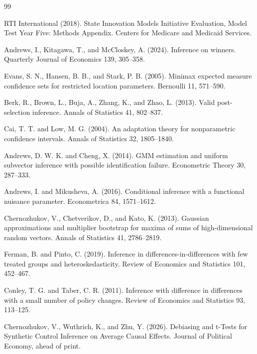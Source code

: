 \documentclass{article}
\begin{document}
\begin{thebibliography}{99}

   RTI International (2018). State Innovation Models Initiative Evaluation, Model Test Year Five: Methods Appendix. Centers for Medicare and Medicaid Services.

   Andrews, I., Kitagawa, T., and McCloskey, A. (2024). Inference on winners. Quarterly Journal of Economics 139, 305--358.

   Evans, S. N., Hansen, B. B., and Stark, P. B. (2005). Minimax expected measure confidence sets for restricted location parameters. Bernoulli 11, 571--590.

   Berk, R., Brown, L., Buja, A., Zhang, K., and Zhao, L. (2013). Valid post-selection inference. Annals of Statistics 41, 802--837.

   Cai, T. T. and Low, M. G. (2004). An adaptation theory for nonparametric confidence intervals. Annals of Statistics 32, 1805--1840.

   Andrews, D. W. K. and Cheng, X. (2014). GMM estimation and uniform subvector inference with possible identification failure. Econometric Theory 30, 287--333.

   Andrews, I. and Mikusheva, A. (2016). Conditional inference with a functional nuisance parameter. Econometrica 84, 1571--1612.

   Chernozhukov, V., Chetverikov, D., and Kato, K. (2013). Gaussian approximations and multiplier bootstrap for maxima of sums of high-dimensional random vectors. Annals of Statistics 41, 2786--2819.

   Ferman, B. and Pinto, C. (2019). Inference in differences-in-differences with few treated groups and heteroskedasticity. Review of Economics and Statistics 101, 452--467.

   Conley, T. G. and Taber, C. R. (2011). Inference with difference in differences with a small number of policy changes. Review of Economics and Statistics 93, 113--125.

   Chernozhukov, V., Wuthrich, K., and Zhu, Y. (2026). Debiasing and t-Tests for Synthetic Control Inference on Average Causal Effects. Journal of Political Economy, ahead of print.


\end{thebibliography}
\end{document}
